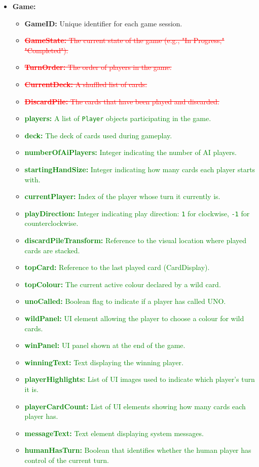 \documentclass[12pt]{article}
\newcommand{\removed}[1]{\textcolor{red}{\sout{#1}}}
\newcommand{\added}[1]{\textcolor{green}{#1}}
\begin{document}
\begin{itemize}
    \item \textbf{Game:}
    \begin{itemize}
        \item \textbf{GameID:} Unique identifier for each game session.
        \item \removed{\textbf{GameState:} The current state of the game (e.g., "In Progress," "Completed").}
        \item \removed{\textbf{TurnOrder:} The order of players in the game.}
        \item \removed{\textbf{CurrentDeck:} A shuffled list of cards.}
        \item \removed{\textbf{DiscardPile:} The cards that have been played and discarded.}
        \item \added{\textbf{players:} A list of \texttt{Player} objects participating in the game.}
        \item \added{\textbf{deck:} The deck of cards used during gameplay.}
        \item \added{\textbf{numberOfAiPlayers:} Integer indicating the number of AI players.}
        \item \added{\textbf{startingHandSize:} Integer indicating how many cards each player starts with.}
        \item \added{\textbf{currentPlayer:} Index of the player whose turn it currently is.}
        \item \added{\textbf{playDirection:} Integer indicating play direction: \texttt{1} for clockwise, \texttt{-1} for counterclockwise.}
        \item \added{\textbf{discardPileTransform:} Reference to the visual location where played cards are stacked.}
        \item \added{\textbf{topCard:} Reference to the last played card (CardDisplay).}
        \item \added{\textbf{topColour:} The current active colour declared by a wild card.}
        \item \added{\textbf{unoCalled:} Boolean flag to indicate if a player has called UNO.}
        \item \added{\textbf{wildPanel:} UI element allowing the player to choose a colour for wild cards.}
        \item \added{\textbf{winPanel:} UI panel shown at the end of the game.}
        \item \added{\textbf{winningText:} Text displaying the winning player.}
        \item \added{\textbf{playerHighlights:} List of UI images used to indicate which player's turn it is.}
        \item \added{\textbf{playerCardCount:} List of UI elements showing how many cards each player has.}
        \item \added{\textbf{messageText:} Text element displaying system messages.}
        \item \added{\textbf{humanHasTurn:} Boolean that identifies whether the human player has control of the current turn.}
    \end{itemize}


\end{itemize}
\end{document}
